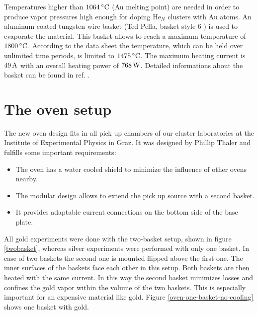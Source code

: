 \documentclass[parskip,12pt,headsepline,a4paper] {scrbook}
\begin{document}
Temperatures higher than $\unit[1064]{^\circ C}$ (Au melting point) are needed in order to produce vapor pressures high enough for doping He$_N$ clusters with Au atoms. An aluminum coated tungsten wire basket (Ted Pella, basket style 6 \cite{albasket}) is used to evaporate the material. This basket allows to reach a maximum temperature of $\unit[1800]{^\circ C}$. According to the data sheet the temperature, which can be held over unlimited time periods, is limited to $\unit[1475]{^\circ C}$. The maximum heating current is $\unit[49]{A}$ with an overall heating power of $\unit[768]{W}$. Detailed informations about the basket can be found in ref. \cite{albasket}. \\

\section{The oven setup}
\vspace{-0.5\baselineskip}
The new oven design fits in all pick up chambers of our cluster laboratories at the Institute of Experimental Physics in Graz. It was designed by Phillip Thaler and fulfills some important requirements:
\begin{itemize}
\item The oven has a water cooled shield to minimize the influence of other ovens nearby.
\item The modular design allows to extend the pick up source with a second basket.
\item It provides adaptable current connections on the bottom side of the base plate.
\end{itemize}

All gold experiments were done with the two-basket setup, shown in figure \ref{twobasket}, whereas silver experiments were performed with only one basket. In case of two baskets the second one is mounted flipped above the first one. The inner surfaces of the baskets face each other in this setup. Both baskets are then heated with the same current. In this way the second basket minimizes losses and confines the gold vapor within the volume of the two baskets. This is especially important for an expensive material like gold. Figure \ref{oven-one-basket-no-cooling} shows one basket with gold.
\end{document}
